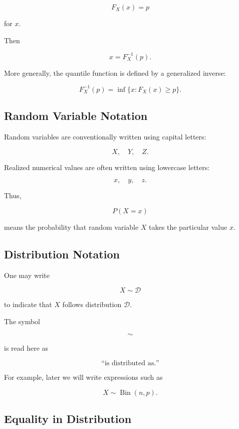 \[
F_X(x)=p
\]

for \(x\).

Then

\[
\boxed{
x=F_X^{-1}(p).
}
\]

More generally, the quantile function is defined by a generalized
inverse:

\[
\boxed{
F_X^{-1}(p)
=
\inf
\{
x:F_X(x)\geq p
\}.
}
\]

\subsection{Random Variable Notation}
\label{subsec:random-variable-notation}

Random variables are conventionally written using capital letters:

\[
X,
\quad
Y,
\quad
Z.
\]

Realized numerical values are often written using lowercase letters:

\[
x,
\quad
y,
\quad
z.
\]

Thus,

\[
\boxed{
P(X=x)
}
\]

means the probability that random variable \(X\) takes the particular
value \(x\).

\subsection{Distribution Notation}
\label{subsec:distribution-notation}

One may write

\[
\boxed{
X\sim\mathcal{D}
}
\]

to indicate that \(X\) follows distribution \(\mathcal{D}\).

The symbol

\[
\sim
\]

is read here as

\[
\text{``is distributed as.''}
\]

For example, later we will write expressions such as

\[
X\sim\operatorname{Bin}(n,p).
\]

\subsection{Equality in Distribution}
\label{subsec:equality-in-distribution}


